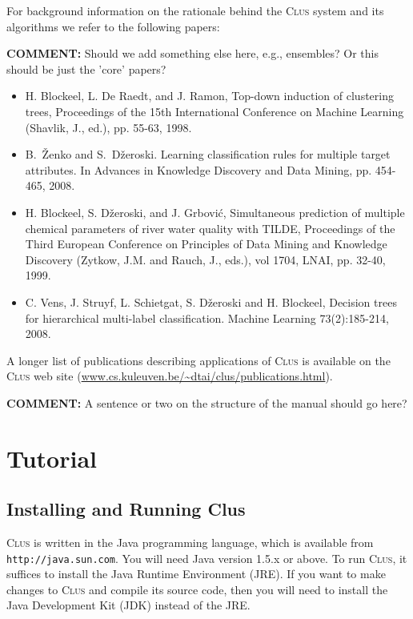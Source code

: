\documentclass[a4paper]{report}
\newcommand{\clus}{\textsc{Clus}}
\newcommand{\comment}[1]{{\color{red}\textbf{COMMENT:} #1}}
\begin{document}
For background information on the rationale behind the \clus{} system and its algorithms we refer to the following papers:

\comment{Should we add something else here, e.g., ensembles? Or this should be just the 'core' papers?}
\begin{itemize} 

\item H. Blockeel, L. De Raedt, and J. Ramon, Top-down induction of clustering trees, Proceedings of the 15th International Conference on Machine Learning (Shavlik, J., ed.), pp. 55-63, 1998.

\item B.~{\v{Z}}enko and S.~D{\v{z}}eroski. Learning classification rules for multiple target attributes. In Advances in Knowledge Discovery and Data Mining, pp. 454-465, 2008.

\item H. Blockeel, S. D\v zeroski, and J. Grbovi\'c, Simultaneous prediction of multiple chemical parameters of river water quality with TILDE, Proceedings of the Third European Conference on Principles of Data Mining and Knowledge Discovery (Zytkow, J.M. and Rauch, J., eds.), vol 1704, LNAI, pp. 32-40, 1999.

\item  C. Vens, J. Struyf, L. Schietgat, S. D\v zeroski and H. Blockeel, Decision trees for hierarchical multi-label classification. Machine Learning 73(2):185-214, 2008.
\end{itemize}

A longer list of publications describing applications of \clus{} is available on the \clus{} web site
(\url{www.cs.kuleuven.be/~dtai/clus/publications.html}).

\comment{A sentence or two on the structure of the manual should go here?}

\chapter{Tutorial}

\section{Installing and Running Clus}
\label{sec:run}

\begin{sloppypar}
\clus{} is written in the Java programming language, which is available from {\tt http://java.sun.com}. You will need Java version 1.5.x or above. To run \clus{}, it suffices to install the Java Runtime Environment (JRE). If you want to make changes to \clus{} and compile its source code, then you will need to install the Java Development Kit (JDK) instead of the JRE.
\end{sloppypar}
\end{document}
